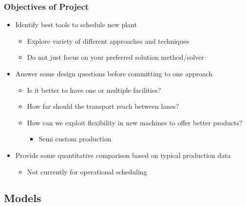 \begin{frame}
\frametitle{Objectives of Project}
\begin{itemize}
\item Identify best tools to schedule new plant
\begin{itemize}
\item Explore variety of different approaches and techniques
\item Do not just focus on your preferred solution method/solver
\end{itemize}

\item Answer some design questions before committing to one approach
\begin{itemize}
\item Is it better to have one or multiple facilities?
\item How far should the transport reach between lanes?
\item How can we exploit flexibility in new machines to offer better products?
\begin{itemize}
\item Semi custom production
\end{itemize}
\end{itemize}

\item Provide some quantitative comparison based on typical production data
\begin{itemize}
\item Not currently for operational scheduling
\end{itemize}

\end{itemize}
\end{frame}

\subsection{Models}

